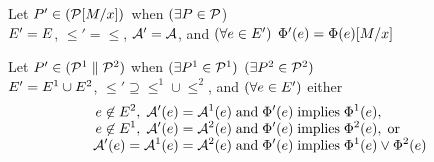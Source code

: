\begin{definition}
  Let $P'\in(\mathcal{P}[M/x])\mkern2mu$ when $(\exists P\in\mathcal{P}$)\\\qquad
  $E' = E$, ${\le'} = {\le}$, $\mathcal{A}' = \mathcal{A}$, and
  $(\forall e\in E')$ $\Phi'(e) = \Phi(e)[M/x]$
\end{definition}
\begin{definition}
  Let $P' \in (\mathcal{P}^1 \parallel \mathcal{P}^2)$ when
  $(\exists P^1 \in \mathcal{P}^1)$ $(\exists P^2 \in \mathcal{P}^2)$
  \\%
  \qquad $E' = E^1 \cup E^2$,
  ${\le'}\supseteq{\le^1}\cup{\le^2}$, and $(\forall e\in E')$ either
  \begin{gather*}
    \begin{aligned}
      e \not\in E^2,\; \mathcal{A}'(e) &= \mathcal{A}^1(e)
      \;\allowbreak\text{and}\allowbreak\; \Phi'(e) \; \allowbreak\text{implies}\allowbreak\; \Phi^1(e),
      \\[-1ex]
      e \not\in E^1,\; \mathcal{A}'(e) &= \mathcal{A}^2(e)
      \;\allowbreak\text{and}\allowbreak\; \Phi'(e) \; \allowbreak\text{implies}\allowbreak\;
      \Phi^2(e),\; \allowbreak\text{or}\allowbreak\;
      \\[-1ex]
      \mathcal{A}'(e) = \mathcal{A}^1(e) &= \mathcal{A}^2(e)
      \;\allowbreak\text{and}\allowbreak\; \Phi'(e) \; \allowbreak\text{implies}\allowbreak\; \Phi^1(e) \lor
      \Phi^2(e)
    \end{aligned}
  \end{gather*}
\end{definition}


